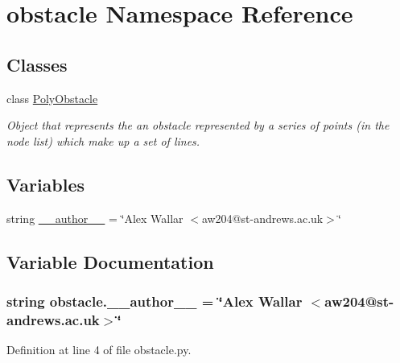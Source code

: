 \hypertarget{namespaceobstacle}{\section{obstacle Namespace Reference}
\label{namespaceobstacle}
}
\subsection*{Classes}
\begin{DoxyCompactItemize}
\item 
class \hyperlink{classobstacle_1_1PolyObstacle}{Poly\-Obstacle}
\begin{DoxyCompactList}\small\item\em Object that represents the an obstacle represented by a series of points (in the node list) which make up a set of lines. \end{DoxyCompactList}\end{DoxyCompactItemize}
\subsection*{Variables}
\begin{DoxyCompactItemize}
\item 
string \hyperlink{namespaceobstacle_a1c1558f418cc7a0e89e687fea6f31edc}{\-\_\-\-\_\-author\-\_\-\-\_\-} = \char`\"{}Alex Wallar $<$aw204@st-\/andrews.\-ac.\-uk$>$\char`\"{}
\end{DoxyCompactItemize}


\subsection{Variable Documentation}
\hypertarget{namespaceobstacle_a1c1558f418cc7a0e89e687fea6f31edc}{
\subsubsection[{\-\_\-\-\_\-author\-\_\-\-\_\-}]{\setlength{\rightskip}{0pt plus 5cm}string obstacle.\-\_\-\-\_\-author\-\_\-\-\_\- = \char`\"{}Alex Wallar $<$aw204@st-\/andrews.\-ac.\-uk$>$\char`\"{}}}\label{namespaceobstacle_a1c1558f418cc7a0e89e687fea6f31edc}


Definition at line 4 of file obstacle.\-py.

